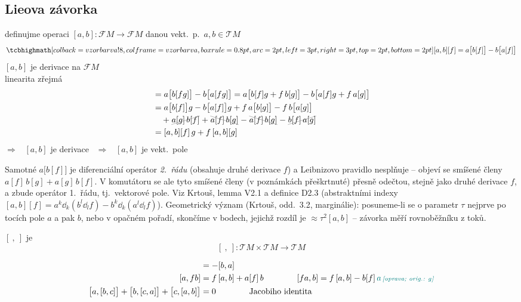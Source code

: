 \newpage
{}
\subsection{Lieova závorka}

definujme operaci $[a,b]:\mathcal{F}M\to\mathcal{F}M$ danou vekt.\ p.\ $a,b\in\mathcal{T}M$
\[
  \vzorec{[a,b][f] = a\big[b[f]\big] - b\big[a[f]\big]}
\]
$[a,b]$ je derivace na $\mathcal{F}M$ \\
\quad linearita zřejmá
\begin{align*}
  [a,b][fg] &= a\big[b[fg]\big] - b\big[a[fg]\big] = a\big[b[f]g + f\,b[g]\big] - b\big[a[f]g + f\,a[g]\big] \\
  &= a\big[b[f]\big]g - b\big[a[f]\big]g + f\,a\big[b[g]\big] - f\,b\big[a[g]\big] \\
  &\quad + \gmItriskrt{a[g]\,b[f]} + \gmItriskrtb{a[f]\,b[g]} - \gmItriskrtb{a[f]\,b[g]} - \gmItriskrt{b[f]\,a[g]} \\
  &= [a,b][f]\,g + f\,[a,b][g]
\end{align*}
\quad $\Rightarrow$ \ $[a,b]$ je derivace \ $\Rightarrow$ \ $[a,b]$ je vekt.\ pole

\begin{vysvetleni}
Samotné $a\big[b[f]\big]$ je diferenciální operátor \emph{2.~řádu} (obsahuje druhé derivace $f$) a Leibnizovo pravidlo nesplňuje -- objeví se smíšené členy $a[f]\,b[g]+a[g]\,b[f]$. V komutátoru se ale tyto smíšené členy (v poznámkách přeškrtnuté) přesně odečtou, stejně jako druhé derivace $f$, a zbude operátor 1.~řádu, tj.\ vektorové pole. Viz Krtouš, lemma V2.1 a definice D2.3 (abstraktními indexy $[a,b][f]=a^k\dd_k(b^l\dd_l f)-b^k\dd_k(a^l\dd_l f)$). Geometrický význam (Krtouš, odd.~3.2, marginálie): posuneme-li se o parametr $\tau$ nejprve po tocích pole $a$ a pak $b$, nebo v opačném pořadí, skončíme v bodech, jejichž rozdíl je $\approx\tau^2[a,b]$ -- závorka měří  rovnoběžníku z toků.
\end{vysvetleni}

\begin{definice}
$[\ ,\ ]$ je 
\[
  [\ ,\ ]:\mathcal{T}M\times\mathcal{T}M\to\mathcal{T}M
\]
\end{definice}

\begin{veta}
\begin{align*}
  [a,b] &= -[b,a] \\
  [a,fb] &= f\,[a,b] + a[f]\,b \qquad\qquad [fa,b] = f\,[a,b] - b[f]\,\oprava{a}{g} \\
  \big[a,[b,c]\big] + \big[b,[c,a]\big] + \big[c,[a,b]\big] &= 0 \qquad\qquad\text{Jacobiho identita}
\end{align*}
\end{veta}


